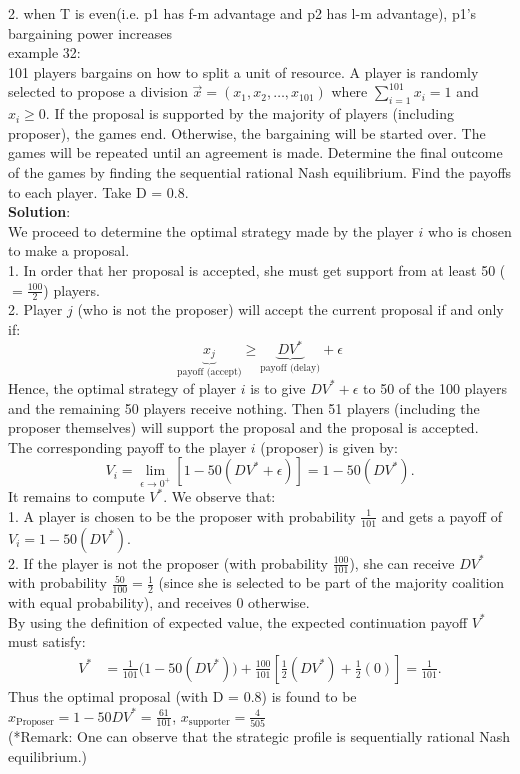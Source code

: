 \documentclass[twoside]{article}
\theoremstyle{definitionstyle}
\begin{document}
2. when T is even(i.e. p1 has f-m advantage and p2 has l-m advantage), p1's bargaining power increases\\
\newline
%
%
%
example 32:\\
101 players bargains on how to split a unit of resource. A player is randomly selected to propose a division $\vec{x} = (x_1, x_2, \dots, x_{101})$ where $\sum_{i=1}^{101} x_i = 1$ and $x_i \ge 0$. 
If the proposal is supported by the majority of players (including proposer), the games end. Otherwise, the bargaining will be started over. The games will be repeated until an agreement is made. 
Determine the final outcome of the games by finding the sequential 
rational Nash equilibrium. Find the payoffs to each player. Take D = 0.8. \\
\textbf{Solution}:\\
We proceed to determine the optimal strategy made by the player $i$ who is chosen to make a proposal.\\
1. In order that her proposal is accepted, she must get support from at least 50 ($=\frac{100}{2}$) players.\\
2. Player $j$ (who is not the proposer) will accept the current proposal if and only if:
    \[
    \underbrace{x_j}_{\text{payoff (accept)}} \ge \underbrace{D V^*}_{\text{payoff (delay)}} + \epsilon
    \]
Hence, the optimal strategy of player $i$ is to give $D V^* + \epsilon$ to 50 of the 100 players and the remaining 50 players receive nothing. Then 51 players (including the proposer themselves) will support the proposal and the proposal is accepted. \\
The corresponding payoff to the player $i$ (proposer) is given by:
\[
V_i = \lim_{\epsilon \to 0^+} \left[ 1 - 50(D V^* + \epsilon) \right] = 1 - 50(D V^*).
\]
It remains to compute $V^*$. We observe that:\\
1. A player is chosen to be the proposer with probability $\frac{1}{101}$ and gets a payoff of $V_i = 1 - 50(D V^*)$.\\
2. If the player is not the proposer (with probability $\frac{100}{101}$), she can receive $D V^*$ with probability $\frac{50}{100} = \frac{1}{2}$ (since she is selected to be part of the majority coalition with equal probability), and receives $0$ otherwise.\\

By using the definition of expected value, the expected continuation payoff $V^*$ must satisfy:
\begin{align*}
V^* &= \frac{1}{101} \Big( 1 - 50(D V^*) \Big) + \frac{100}{101} \left[ \frac{1}{2}(D V^*) + \frac{1}{2}(0) \right] = \frac{1}{101}.
\end{align*}
Thus the optimal proposal (with D = 0.8) is found to be $x_{\text{Proposer}} = 1 - 50 DV^* = \frac{61}{101}$, $x_{\text{supporter}} = \frac{4}{505}$\\
(*Remark: One can observe that the strategic profile is sequentially rational Nash equilibrium.) 
\end{document}
